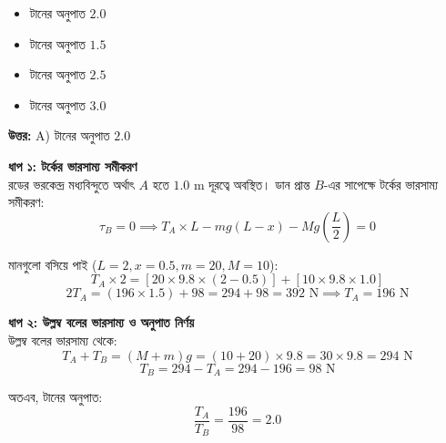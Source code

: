 \documentclass[12pt, a4paper]{article}
\begin{document}
\begin{itemize}[label={}, leftmargin=1cm, itemsep=0.5em]
    \item[\textbf{A)}] টানের অনুপাত $2.0$
    \item[\textbf{B)}] টানের অনুপাত $1.5$
    \item[\textbf{C)}] টানের অনুপাত $2.5$
    \item[\textbf{D)}] টানের অনুপাত $3.0$
\end{itemize}

\vspace{0.5em}
\begin{tcolorbox}[answerbox]
    \textbf{\color{success} উত্তর:} A) টানের অনুপাত $2.0$
\end{tcolorbox}
\vspace{1em}

\begin{tcolorbox}[solutionbox={সমাধান (Solution)}]
    \noindent
    \textbf{ধাপ ১: টর্কের ভারসাম্য সমীকরণ} \\
    রডের ভরকেন্দ্র মধ্যবিন্দুতে অর্থাৎ $A$ হতে $1.0\text{ m}$ দূরত্বে অবস্থিত। ডান প্রান্ত $B$-এর সাপেক্ষে টর্কের ভারসাম্য সমীকরণ:
    \[ \tau_B = 0 \implies T_A \times L - m g (L - x) - M g \left(\frac{L}{2}\right) = 0 \]
    
    মানগুলো বসিয়ে পাই ($L = 2, x = 0.5, m = 20, M = 10$):
    \[ T_A \times 2 = [20 \times 9.8 \times (2 - 0.5)] + [10 \times 9.8 \times 1.0] \]
    \[ 2 T_A = (196 \times 1.5) + 98 = 294 + 98 = 392\text{ N} \implies T_A = 196\text{ N} \]
    
    \vspace{0.5em}
    \noindent\textbf{ধাপ ২: উল্লম্ব বলের ভারসাম্য ও অনুপাত নির্ণয়} \\
    উল্লম্ব বলের ভারসাম্য থেকে:
    \[ T_A + T_B = (M + m) g = (10 + 20) \times 9.8 = 30 \times 9.8 = 294\text{ N} \]
    \[ T_B = 294 - T_A = 294 - 196 = 98\text{ N} \]
    
    অতএব, টানের অনুপাত:
    \[ \frac{T_A}{T_B} = \frac{196}{98} = \mathbf{2.0} \]
\end{tcolorbox}

\newpage
\end{document}
